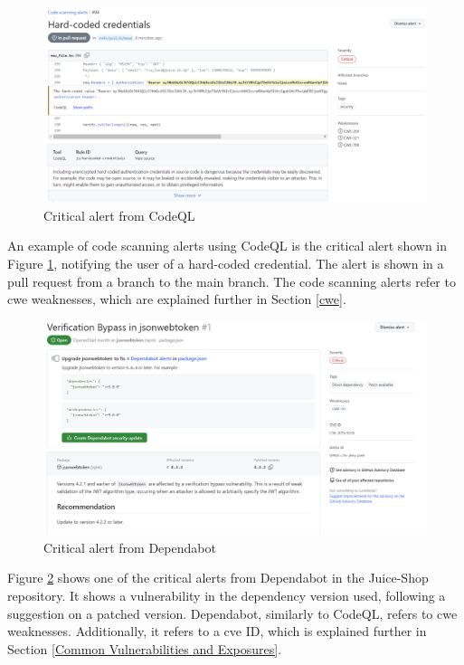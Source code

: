 \vspace{2mm}
\begin{figure}[H]
    \centering
    \includegraphics[width=0.8\columnwidth]{Images/codescan.png}
    \caption{Critical alert from CodeQL}
    \label{fig: Critical alert CodeQL}
\end{figure}

An example of code scanning alerts using CodeQL is the critical alert shown in Figure \ref{fig: Critical alert CodeQL}, notifying the user of a hard-coded credential. The alert is shown in a pull request from a branch to the main branch. The code scanning alerts refer to \acrshort{cwe} weaknesses, which are explained further in Section \ref{cwe}.

\vspace{2mm}
\begin{figure}[H]
    \centering
    \includegraphics[width=0.8\columnwidth]{Images/dependabotalert.png}
    \caption{Critical alert from Dependabot}
    \label{fig: Critical alert from Dependabot}
\end{figure}

Figure \ref{fig: Critical alert from Dependabot} shows one of the critical alerts from Dependabot in the Juice-Shop repository. It shows a vulnerability in the dependency version used, following a suggestion on a patched version. Dependabot, similarly to CodeQL, refers to \acrshort{cwe} weaknesses. Additionally, it refers to a \acrshort{cve} ID, which is explained further in Section \ref{Common Vulnerabilities and Exposures}.

